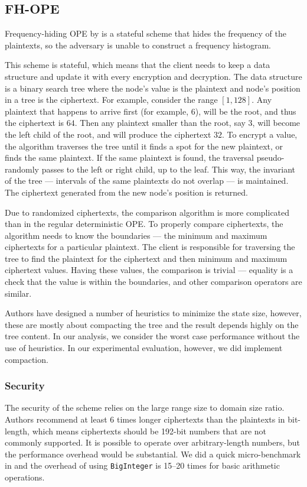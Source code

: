 \subsection{FH-OPE}

	Frequency-hiding OPE by \textcite{fh-ope} is a stateful scheme that hides the frequency of the plaintexts, so the adversary is unable to construct a frequency histogram.

	This scheme is stateful, which means that the client needs to keep a data structure and update it with every encryption and decryption.
	The data structure is a binary search tree where the node's value is the plaintext and node's position in a tree is the ciphertext.
	For example, consider the range $[1, 128]$.
	Any plaintext that happens to arrive first (for example, $6$), will be the root, and thus the ciphertext is $64$.
	Then any plaintext smaller than the root, say $3$, will become the left child of the root, and will produce the ciphertext $32$.
	To encrypt a value, the algorithm traverses the tree until it finds a spot for the new plaintext, or finds the same plaintext.
	If the same plaintext is found, the traversal pseudo-randomly passes to the left or right child, up to the leaf.
	This way, the invariant of the tree --- intervals of the same plaintexts do not overlap --- is maintained.
	The ciphertext generated from the new node's position is returned.

	Due to randomized ciphertexts, the comparison algorithm is more complicated than in the regular deterministic OPE\@.
	To properly compare ciphertexts, the algorithm needs to know the boundaries --- the minimum and maximum ciphertexts for a particular plaintext.
	The client is responsible for traversing the tree to find the plaintext for the ciphertext and then minimum and maximum ciphertext values.
	Having these values, the comparison is trivial --- equality is a check that the value is within the boundaries, and other comparison operators are similar.

	Authors have designed a number of heuristics to minimize the state size, however, these are mostly about compacting the tree and the result depends highly on the tree content.
	In our analysis, we consider the worst case performance without the use of heuristics.
	In our experimental evaluation, however, we did implement compaction.

	\subsubsection{Security}
		The security of the scheme relies on the large range size to domain size ratio.
		Authors recommend at least 6 times longer ciphertexts than the plaintexts in bit-length, which means ciphertexts should be 192-bit numbers that are not commonly supported.
		It is possible to operate over arbitrary-length numbers, but the performance overhead would be substantial.
		We did a quick micro-benchmark in {\Csharp} and the overhead of using \texttt{BigInteger} is 15--20 times for basic arithmetic operations.

